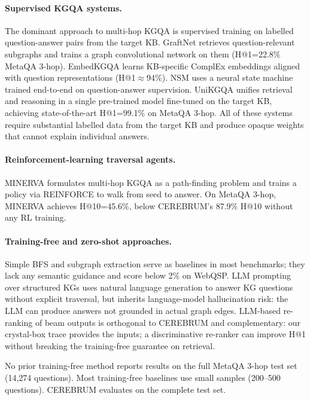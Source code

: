 \documentclass[11pt,a4paper]{article}
\begin{document}
\paragraph{Supervised KGQA systems.}
The dominant approach to multi-hop KGQA is supervised training on labelled
question-answer pairs from the target KB. GraftNet \cite{sun2018graftnet}
retrieves question-relevant subgraphs and trains a graph convolutional network
on them (H@1=22.8\% MetaQA 3-hop). EmbedKGQA \cite{saxena2020improve} learns
KB-specific ComplEx embeddings aligned with question representations
(H@1$\approx$94\%). NSM \cite{he2021} uses a neural state machine trained
end-to-end on question-answer supervision. UniKGQA \cite{jiang2023}
unifies retrieval and reasoning in a single pre-trained model fine-tuned on the
target KB, achieving state-of-the-art H@1=99.1\% on MetaQA 3-hop. All of these
systems require substantial labelled data from the target KB and produce opaque
weights that cannot explain individual answers.

\paragraph{Reinforcement-learning traversal agents.}
MINERVA \cite{das2018minerva} formulates multi-hop KGQA as a path-finding
problem and trains a policy via REINFORCE to walk from seed to answer. On MetaQA
3-hop, MINERVA achieves H@10=45.6\%, below CEREBRUM's 87.9\% H@10 without any
RL training.

\paragraph{Training-free and zero-shot approaches.}
Simple BFS and subgraph extraction serve as baselines in most benchmarks; they
lack any semantic guidance and score below 2\% on WebQSP. LLM prompting over
structured KGs uses natural language generation to answer KG questions without
explicit traversal, but inherits language-model hallucination risk: the LLM can
produce answers not grounded in actual graph edges. LLM-based re-ranking of beam
outputs is orthogonal to CEREBRUM and complementary: our crystal-box trace
provides the inputs; a discriminative re-ranker can improve H@1 without breaking
the training-free guarantee on retrieval.

No prior training-free method reports results on the full MetaQA 3-hop test set
(14,274 questions). Most training-free baselines use small samples (200–500
questions). CEREBRUM evaluates on the complete test set.
\end{document}
